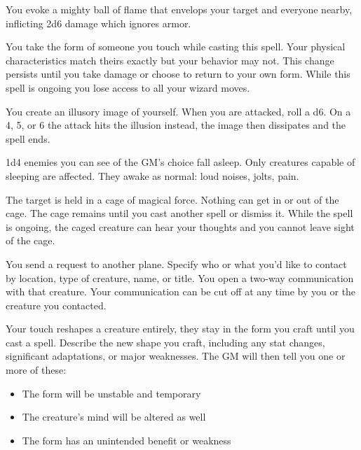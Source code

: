 You evoke a mighty ball of flame that envelops your target and everyone nearby, inflicting 2d6 damage which ignores armor.





 You take the form of someone you touch while casting this spell. Your physical characteristics match theirs exactly but your behavior may not. This change persists until you take damage or choose to return to your own form. While this spell is ongoing you lose access to all your wizard moves.





 You create an illusory image of yourself. When you are attacked, roll a d6. On a 4, 5, or 6 the attack hits the illusion instead, the image then dissipates and the spell ends.





 1d4 enemies you can see of the GM's choice fall asleep. Only creatures capable of sleeping are affected. They awake as normal: loud noises, jolts, pain.





 The target is held in a cage of magical force. Nothing can get in or out of the cage. The cage remains until you cast another spell or dismiss it. While the spell is ongoing, the caged creature can hear your thoughts and you cannot leave sight of the cage.





 You send a request to another plane. Specify who or what you'd like to contact by location, type of creature, name, or title. You open a two-way communication with that creature. Your communication can be cut off at any time by you or the creature you contacted.





 Your touch reshapes a creature entirely, they stay in the form you craft until you cast a spell. Describe the new shape you craft, including any stat changes, significant adaptations, or major weaknesses. The GM will then tell you one or more of these:
\begin{itemize}
\item The form will be unstable and temporary
\item The creature's mind will be altered as well
\item The form has an unintended benefit or weakness

\end{itemize}


